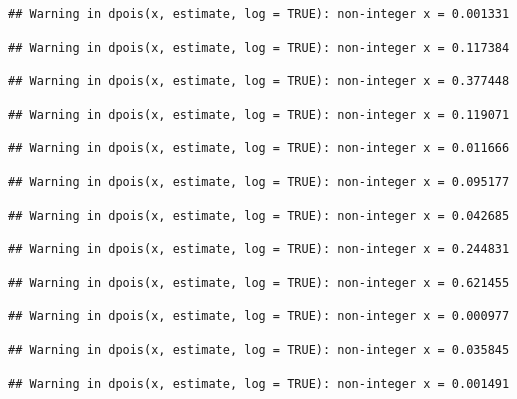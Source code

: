 \documentclass[]{article}
\begin{document}
\begin{verbatim}
## Warning in dpois(x, estimate, log = TRUE): non-integer x = 0.001331
\end{verbatim}

\begin{verbatim}
## Warning in dpois(x, estimate, log = TRUE): non-integer x = 0.117384
\end{verbatim}

\begin{verbatim}
## Warning in dpois(x, estimate, log = TRUE): non-integer x = 0.377448
\end{verbatim}

\begin{verbatim}
## Warning in dpois(x, estimate, log = TRUE): non-integer x = 0.119071
\end{verbatim}

\begin{verbatim}
## Warning in dpois(x, estimate, log = TRUE): non-integer x = 0.011666
\end{verbatim}

\begin{verbatim}
## Warning in dpois(x, estimate, log = TRUE): non-integer x = 0.095177
\end{verbatim}

\begin{verbatim}
## Warning in dpois(x, estimate, log = TRUE): non-integer x = 0.042685
\end{verbatim}

\begin{verbatim}
## Warning in dpois(x, estimate, log = TRUE): non-integer x = 0.244831
\end{verbatim}

\begin{verbatim}
## Warning in dpois(x, estimate, log = TRUE): non-integer x = 0.621455
\end{verbatim}

\begin{verbatim}
## Warning in dpois(x, estimate, log = TRUE): non-integer x = 0.000977
\end{verbatim}

\begin{verbatim}
## Warning in dpois(x, estimate, log = TRUE): non-integer x = 0.035845
\end{verbatim}

\begin{verbatim}
## Warning in dpois(x, estimate, log = TRUE): non-integer x = 0.001491
\end{verbatim}
\end{document}
